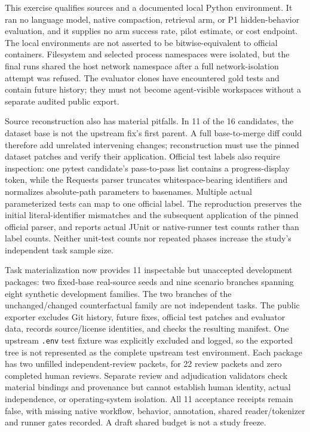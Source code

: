 \documentclass[
  11pt,
  a4paper,
]{article}
\begin{document}
This exercise qualifies sources and a documented local Python
environment. It ran no language model, native compaction, retrieval arm,
or P1 hidden-behavior evaluation, and it supplies no arm success rate,
pilot estimate, or cost endpoint. The local environments are not
asserted to be bitwise-equivalent to official containers. Filesystem and
selected process namespaces were isolated, but the final runs shared the
host network namespace after a full network-isolation attempt was
refused. The evaluator clones have encountered gold tests and contain
future history; they must not become agent-visible workspaces without a
separate audited public export.

Source reconstruction also has material pitfalls. In 11 of the 16
candidates, the dataset base is not the upstream fix's first parent. A
full base-to-merge diff could therefore add unrelated intervening
changes; reconstruction must use the pinned dataset patches and verify
their application. Official test labels also require inspection: one
pytest candidate's pass-to-pass list contains a progress-display token,
while the Requests parser truncates whitespace-bearing identifiers and
normalizes absolute-path parameters to basenames. Multiple actual
parameterized tests can map to one official label. The reproduction
preserves the initial literal-identifier mismatches and the subsequent
application of the pinned official parser, and reports actual JUnit or
native-runner test counts rather than label counts. Neither unit-test
counts nor repeated phases increase the study's independent task sample
size.

Task materialization now provides 11 inspectable but unaccepted
development packages: two fixed-base real-source seeds and nine scenario
branches spanning eight synthetic development families. The two branches
of the unchanged/changed counterfactual family are not independent
tasks. The public exporter excludes Git history, future fixes, official
test patches and evaluator data, records source/license identities, and
checks the resulting manifest. One upstream \texttt{.env} test fixture
was explicitly excluded and logged, so the exported tree is not
represented as the complete upstream test environment. Each package has
two unfilled independent-review packets, for 22 review packets and zero
completed human reviews. Separate review and adjudication validators
check material bindings and provenance but cannot establish human
identity, actual independence, or operating-system isolation. All 11
acceptance receipts remain false, with missing native workflow,
behavior, annotation, shared reader/tokenizer and runner gates recorded.
A draft shared budget is not a study freeze.
\end{document}
